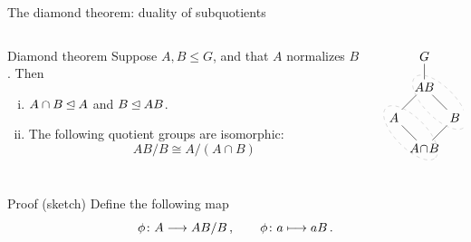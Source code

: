 \documentclass[8pt, handout]{beamer}
\newcommand{\Pause}{}      %
\begin{document}

\begin{frame}{The diamond theorem: duality of subquotients}
  
  \vspace{-3mm}
  
  \begin{columns}
    \begin{column}{.77\textwidth}
      \begin{block}{Diamond theorem}
        Suppose $A,B\leq G$, and that $A$ normalizes $B$. \Pause Then
        \begin{enumerate}[(i)]
        \item $A\cap B\unlhd A$ and $B\unlhd AB$. \Pause
        \item The following quotient groups are isomorphic:
          \[
          AB/B\cong A/(A\cap B)
          \]
        \end{enumerate}
      \end{block}
    \end{column}
    \begin{column}{.2\textwidth}
      \[
      \begin{tikzpicture}[shorten >= -1pt, shorten <= -1pt,scale=.85]
        \begin{scope}[shift={(0,0)}]
          \node(G) at (0,3) {$G$};
          \node(AB) at (0,2) {$AB$};
          \node(A) at (-1,1) {$A$};
          \node(B) at (1,1) {$B$};
          \node(AcapB) at (0,0) {$A\!\cap\!B$};
          \draw (G) -- (AB);
          \draw (AB) -- (A); \draw (AB) -- (B);
          \draw (AcapB) -- (A); \draw (AcapB) -- (B);
          \draw[dashed,faded] (.5,1.5) circle [x radius=1.15cm,y radius=.5cm,rotate=-45];
          \draw[dashed,faded] (-.45,.5) circle [x radius=1.15cm,y radius=.5cm,rotate=-45];
        \end{scope}
      \end{tikzpicture}
      \]
    \end{column}
  \end{columns}
  
  \Pause\vspace{-2mm}
  
  \begin{exampleblock}{Proof (sketch)}
    Define the following map \vspace{-2mm}
    \[
    \phi\colon A\longto AB/B\,,\qquad\phi\colon a\longmapsto\Pause aB\,.
    \]
    

\end{exampleblock}
\end{frame}
\end{document}
